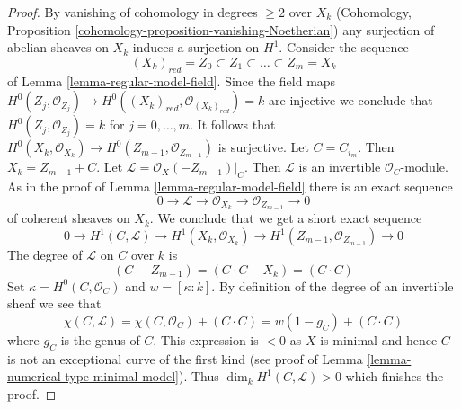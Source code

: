 \documentclass[10pt,a4paper]{amsart}
\theoremstyle{plain}
\theoremstyle{definition}
\theoremstyle{remark}
\numberwithin{equation}{subsection}
\begin{document}
\begin{proof}
By vanishing of cohomology in degrees $\geq 2$ over $X_k$
(Cohomology, Proposition \ref{cohomology-proposition-vanishing-Noetherian})
any surjection of abelian sheaves on $X_k$ induces a surjection on $H^1$.
Consider the sequence
$$
(X_k)_{red} = Z_0 \subset Z_1 \subset \ldots \subset Z_m = X_k
$$
of Lemma \ref{lemma-regular-model-field}. Since the field maps
$H^0(Z_j, \mathcal{O}_{Z_j}) \to
H^0((X_k)_{red}, \mathcal{O}_{(X_k)_{red}}) = k$
are injective we conclude that $H^0(Z_j, \mathcal{O}_{Z_j}) = k$ for
$j = 0, \ldots, m$. It follows that
$H^0(X_k, \mathcal{O}_{X_k}) \to H^0(Z_{m - 1}, \mathcal{O}_{Z_{m - 1}})$
is surjective. Let $C = C_{i_m}$. Then $X_k = Z_{m - 1} + C$.
Let $\mathcal{L} = \mathcal{O}_X(-Z_{m - 1})|_C$.
Then $\mathcal{L}$ is an invertible $\mathcal{O}_C$-module.
As in the proof of Lemma \ref{lemma-regular-model-field}
there is an exact sequence
$$
0 \to \mathcal{L} \to \mathcal{O}_{X_k} \to \mathcal{O}_{Z_{m - 1}} \to 0
$$
of coherent sheaves on $X_k$. We conclude that
we get a short exact sequence
$$
0 \to
H^1(C, \mathcal{L}) \to H^1(X_k, \mathcal{O}_{X_k}) \to
H^1(Z_{m - 1}, \mathcal{O}_{Z_{m - 1}}) \to 0
$$
The degree of $\mathcal{L}$ on $C$ over $k$ is
$$
(C \cdot -Z_{m - 1}) = (C \cdot C - X_k) = (C \cdot C)
$$
Set $\kappa = H^0(C, \mathcal{O}_C)$ and $w = [\kappa : k]$.
By definition of the degree of an invertible sheaf we see that
$$
\chi(C, \mathcal{L}) =
\chi(C, \mathcal{O}_C) + (C \cdot C) =
w(1 - g_C) + (C \cdot C)
$$
where $g_C$ is the genus of $C$. This expression is $< 0$ as $X$ is minimal
and hence $C$ is not an exceptional curve of the first kind
(see proof of Lemma \ref{lemma-numerical-type-minimal-model}).
Thus $\dim_k H^1(C, \mathcal{L}) > 0$ which finishes the proof.
\end{proof}
\end{document}
